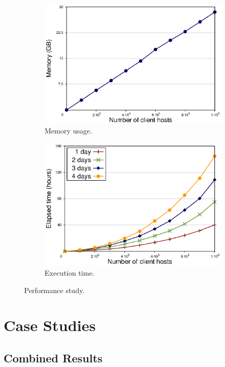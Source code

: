 \begin{figure}[htbp] 
	\begin{subfigure}{0.5\textwidth}
		\includegraphics[width=\linewidth]{figures/memory}
		\caption{Memory usage.} 
		\label{fig:memory}
	\end{subfigure}
	\hspace*{\fill} %
	\begin{subfigure}{0.5\textwidth}
		\includegraphics[width=\linewidth]{figures/time}
		\caption{Execution time.} 
		\label{fig:time}
	\end{subfigure}
	\caption{Performance study.}
	\label{fig:performance}
\end{figure}

\clearpage

\section{Case Studies}
\label{sec:case_studies}




\subsection{Combined Results}

